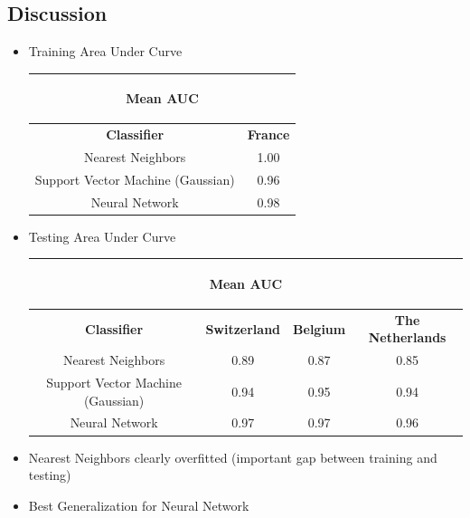 \documentclass[c]{beamer}
\begin{document}
\subsection{Discussion}
\begin{itemize}
 \item Training Area Under Curve
 \begin{table}
    \begin{center}
    \begin{adjustbox}{max width=0.9\textwidth}
    {\scriptsize
    \begin{tabular}{|c|c|}
      \hline
      \multicolumn{2}{|c|}{\begin{bf} Mean AUC \end{bf}} \\
      \hline
      \textbf{Classifier} & \textbf{France} \\
      \hline
      Nearest Neighbors & 1.00\\
      \hline
      Support Vector Machine (Gaussian) & 0.96\\
      \hline
      Neural Network & 0.98\\
      \hline
    \end{tabular}
    }
    \end{adjustbox}
    \end{center}
  \end{table}
  
  \item Testing Area Under Curve
 \begin{table}
    \begin{center}
    \begin{adjustbox}{max width=0.9\textwidth}
    {\scriptsize
    \begin{tabular}{|c|c|c|c|}
      \hline
      \multicolumn{4}{|c|}{\begin{bf} Mean AUC\end{bf}} \\
      \hline
      \textbf{Classifier} & \textbf{Switzerland} & \textbf{Belgium} & \textbf{The Netherlands}\\
      \hline
      Nearest Neighbors & 0.89 & 0.87 & 0.85\\
      \hline
      Support Vector Machine (Gaussian) & 0.94 & 0.95 & 0.94\\
      \hline
      Neural Network & 0.97 & 0.97 & 0.96\\
      \hline
    \end{tabular}
    }
    \end{adjustbox}
    \end{center}
  \end{table}
  \item Nearest Neighbors clearly overfitted (important gap between training and testing)
  \item Best Generalization for Neural Network
  
\end{itemize}
\end{document}

